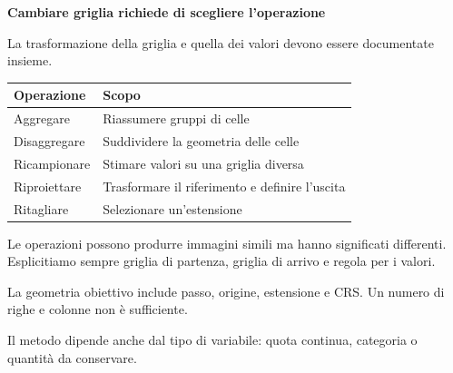\documentclass[12pt,aspectratio=1610]{beamer}
\newcommand{\PBody}[1]{\par{\fontsize{11.3}{14.8}\selectfont #1\par}}
\newcommand{\PSmall}[1]{\par{\fontsize{9.8}{13.1}\selectfont #1\par}}
\newcommand{\PInfo}[1]{%
\begin{tcolorbox}[enhanced,arc=1.6mm,boxrule=.55pt,colback=GeoTint,
 colframe=Rule!80!Classical,left=2.3mm,right=2.3mm,top=2mm,bottom=2mm,
 before skip=1mm,after skip=1mm]
\PSmall{#1}\end{tcolorbox}}
\begin{document}
\begin{frame}[plain]\hypertarget{slide33}{}
\begin{lrbox}{\TitleBox}
\begin{minipage}[t]{17.7cm}\raggedright\color{Ink}\fontsize{11.3}{14.8}\selectfont
\color{Navy}\bfseries\fontsize{20.6}{24.5}\selectfont Cambiare griglia richiede di scegliere l’operazione
\end{minipage}\end{lrbox}

\begin{lrbox}{\RecallBox}
\begin{minipage}[t]{14.3cm}\raggedright\color{Ink}\fontsize{11.3}{14.8}\selectfont
\fontsize{10.3}{13.8}\selectfont La trasformazione della griglia e quella dei valori devono essere documentate insieme.
\end{minipage}\end{lrbox}

\begin{lrbox}{\PilotLeftBox}
\begin{minipage}[t]{10.05cm}\raggedright\color{Ink}\fontsize{11.3}{14.8}\selectfont
{\fontsize{10.2}{13.1}\selectfont\renewcommand{\arraystretch}{1.45}\begin{tabular}{@{}p{3.6cm}p{5.4cm}@{}}\toprule
\textbf{Operazione} & \textbf{Scopo}\\\midrule
Aggregare & Riassumere gruppi di celle\\
Disaggregare & Suddividere la geometria delle celle\\
Ricampionare & Stimare valori su una griglia diversa\\
Riproiettare & Trasformare il riferimento e definire l’uscita\\
Ritagliare & Selezionare un’estensione\\
\bottomrule\end{tabular}}

\end{minipage}\end{lrbox}

\begin{lrbox}{\PilotRightBox}
\begin{minipage}[t]{7.55cm}\raggedright\color{Ink}\fontsize{11.3}{14.8}\selectfont
\PBody{Le operazioni possono produrre immagini simili ma hanno significati differenti. Esplicitiamo sempre griglia di partenza, griglia di arrivo e regola per i valori.}
\vspace{2.5mm}
\PInfo{La geometria obiettivo include passo, origine, estensione e CRS. Un numero di righe e colonne non è sufficiente.}
\PBody{Il metodo dipende anche dal tipo di variabile: quota continua, categoria o quantità da conservare.}
\vspace{2.5mm}


\end{minipage}
\end{lrbox}
\end{frame}
\end{document}
